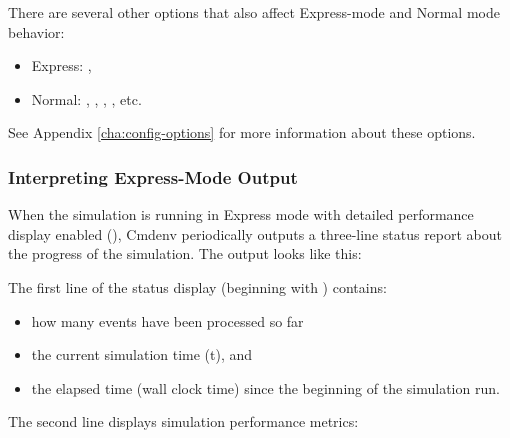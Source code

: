There are several other options that also affect Express-mode and Normal
mode behavior:

\begin{itemize}
  \item Express: , 
  \item Normal: , ,
        , , etc.
\end{itemize}

See Appendix \ref{cha:config-options} for more information about these options.

\subsubsection{Interpreting Express-Mode Output}
\label{sec:run-sim:cmdenv:express-mode:output}

When the simulation is running in Express mode with detailed
performance display enabled (), Cmdenv
periodically outputs a three-line status report about the progress of the simulation.
The output looks like this:


The first line of the status display (beginning with \ttt{**})
contains:

\begin{itemize}
   \item how many events have been processed so far
   \item the current simulation time (t), and
   \item the elapsed time (wall clock time) since the beginning of the simulation run.
\end{itemize}

The second line displays simulation performance metrics:

